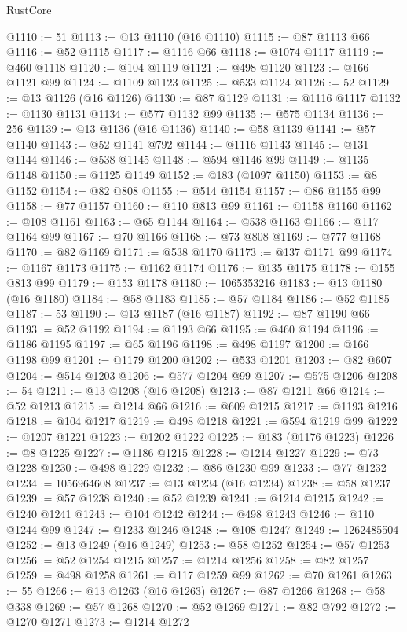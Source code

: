 \begin{lexlean}{RustCore}
\begin{coremodule}
@1110 := 51
@1113 := @13 @1110 (@16 @1110)
@1115 := @87 @1113 @66
@1116 := @52 @1115
@1117 := @1116 @66
@1118 := @1074 @1117
@1119 := @460 @1118
@1120 := @104 @1119
@1121 := @498 @1120
@1123 := @166 @1121 @99
@1124 := @1109 @1123
@1125 := @533 @1124
@1126 := 52
@1129 := @13 @1126 (@16 @1126)
@1130 := @87 @1129
@1131 := @1116 @1117
@1132 := @1130 @1131
@1134 := @577 @1132 @99
@1135 := @575 @1134
@1136 := 256
@1139 := @13 @1136 (@16 @1136)
@1140 := @58 @1139
@1141 := @57 @1140
@1143 := @52 @1141 @792
@1144 := @1116 @1143
@1145 := @131 @1144
@1146 := @538 @1145
@1148 := @594 @1146 @99
@1149 := @1135 @1148
@1150 := @1125 @1149
@1152 := @183 (@1097 @1150)
@1153 := @8 @1152
@1154 := @82 @808
@1155 := @514 @1154
@1157 := @86 @1155 @99
@1158 := @77 @1157
@1160 := @110 @813 @99
@1161 := @1158 @1160
@1162 := @108 @1161
@1163 := @65 @1144
@1164 := @538 @1163
@1166 := @117 @1164 @99
@1167 := @70 @1166
@1168 := @73 @808
@1169 := @777 @1168
@1170 := @82 @1169
@1171 := @538 @1170
@1173 := @137 @1171 @99
@1174 := @1167 @1173
@1175 := @1162 @1174
@1176 := @135 @1175
@1178 := @155 @813 @99
@1179 := @153 @1178
@1180 := 1065353216
@1183 := @13 @1180 (@16 @1180)
@1184 := @58 @1183
@1185 := @57 @1184
@1186 := @52 @1185
@1187 := 53
@1190 := @13 @1187 (@16 @1187)
@1192 := @87 @1190 @66
@1193 := @52 @1192
@1194 := @1193 @66
@1195 := @460 @1194
@1196 := @1186 @1195
@1197 := @65 @1196
@1198 := @498 @1197
@1200 := @166 @1198 @99
@1201 := @1179 @1200
@1202 := @533 @1201
@1203 := @82 @607
@1204 := @514 @1203
@1206 := @577 @1204 @99
@1207 := @575 @1206
@1208 := 54
@1211 := @13 @1208 (@16 @1208)
@1213 := @87 @1211 @66
@1214 := @52 @1213
@1215 := @1214 @66
@1216 := @609 @1215
@1217 := @1193 @1216
@1218 := @104 @1217
@1219 := @498 @1218
@1221 := @594 @1219 @99
@1222 := @1207 @1221
@1223 := @1202 @1222
@1225 := @183 (@1176 @1223)
@1226 := @8 @1225
@1227 := @1186 @1215
@1228 := @1214 @1227
@1229 := @73 @1228
@1230 := @498 @1229
@1232 := @86 @1230 @99
@1233 := @77 @1232
@1234 := 1056964608
@1237 := @13 @1234 (@16 @1234)
@1238 := @58 @1237
@1239 := @57 @1238
@1240 := @52 @1239
@1241 := @1214 @1215
@1242 := @1240 @1241
@1243 := @104 @1242
@1244 := @498 @1243
@1246 := @110 @1244 @99
@1247 := @1233 @1246
@1248 := @108 @1247
@1249 := 1262485504
@1252 := @13 @1249 (@16 @1249)
@1253 := @58 @1252
@1254 := @57 @1253
@1256 := @52 @1254 @1215
@1257 := @1214 @1256
@1258 := @82 @1257
@1259 := @498 @1258
@1261 := @117 @1259 @99
@1262 := @70 @1261
@1263 := 55
@1266 := @13 @1263 (@16 @1263)
@1267 := @87 @1266
@1268 := @58 @338
@1269 := @57 @1268
@1270 := @52 @1269
@1271 := @82 @792
@1272 := @1270 @1271
@1273 := @1214 @1272

\end{coremodule}
\end{lexlean}
